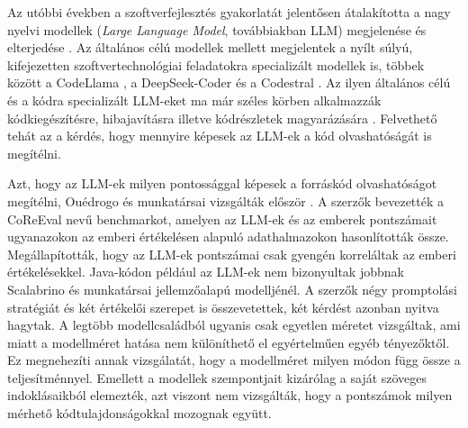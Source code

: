 \documentclass[
]{elteikthesis}[2024/04/26]
\begin{document}
Az utóbbi években a szoftverfejlesztés gyakorlatát jelentősen átalakította a
nagy nyelvi modellek (\textit{Large Language Model}, továbbiakban LLM)
megjelenése és elterjedése \cite{brown2020gpt3,touvron2023llama}.
Az általános célú modellek mellett megjelentek a nyílt súlyú, kifejezetten
szoftvertechnológiai feladatokra specializált modellek is, többek között a
CodeLlama \cite{roziere2023codellama}, a DeepSeek-Coder
\cite{guo2024deepseekcoder} és a Codestral \cite{mistral2024codestral}. Az ilyen
általános célú és a kódra specializált LLM-eket ma már széles körben alkalmazzák
kódkiegészítésre, hibajavításra illetve kódrészletek magyarázására
\cite{hou2024llm4se}. Felvethető tehát az a kérdés,
hogy mennyire képesek az LLM-ek a kód olvashatóságát is megítélni.

Azt, hogy az LLM-ek milyen pontossággal képesek a forráskód olvashatóságot
megítélni, Ouédrogo és munkatársai vizsgálták először
\cite{ouedraogo2025coreeval}. A szerzők bevezették a CoReEval nevű benchmarkot,
amelyen az LLM-ek és az emberek pontszámait ugyanazokon az emberi értékelésen
alapuló adathalmazokon hasonlították össze. Megállapították, hogy az LLM-ek
pontszámai csak gyengén korreláltak az emberi értékelésekkel. Java-kódon például %
az LLM-ek nem bizonyultak jobbnak Scalabrino és munkatársai jellemzőalapú
modelljénél. %
A szerzők négy promptolási stratégiát és két értékelői szerepet is
összevetettek, két kérdést azonban nyitva hagytak. A legtöbb modellcsaládból
ugyanis csak egyetlen méretet vizsgáltak, ami miatt a modellméret hatása nem
különíthető el egyértelműen egyéb tényezőktől.
Ez megnehezíti annak vizsgálatát, hogy a modellméret milyen módon függ össze a
teljesítménnyel. Emellett a modellek szempontjait kizárólag a saját szöveges
indoklásaikból elemezték, azt viszont nem vizsgálták, hogy a pontszámok milyen
mérhető kódtulajdonságokkal mozognak együtt.
\end{document}
